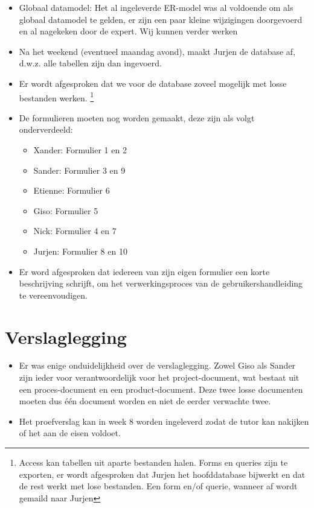 \documentclass[]{article}
\begin{document}
\begin{itemize}
   \item Globaal datamodel: Het al ingeleverde ER-model was al voldoende om als globaal datamodel te gelden, er zijn een paar kleine wijzigingen doorgevoerd en al nagekeken door de expert. Wij kunnen verder werken
   \item Na het weekend (eventueel maandag avond), maakt Jurjen de database af, d.w.z. alle tabellen zijn dan ingevoerd.
   \item Er wordt afgesproken dat we voor de database zoveel mogelijk met losse bestanden werken. \footnote{Access kan tabellen uit aparte bestanden halen. Forms en queries zijn te exporten, er wordt afgesproken dat Jurjen het hoofddatabase bijwerkt en dat de rest werkt met lose bestanden. Een form en/of querie, wanneer af wordt gemaild naar Jurjen} 
   \item De formulieren moeten nog worden gemaakt, deze zijn als volgt onderverdeeld:
   		\begin{itemize}
   			\item Xander: Formulier 1 en 2
   			\item Sander: Formulier 3 en 9
   			\item Etienne: Formulier 6
   			\item Giso: Formulier 5
   			\item Nick: Formulier 4 en 7
   			\item Jurjen: Formulier 8 en 10
   		\end{itemize}
   	\item Er word afgesproken dat iedereen van zijn eigen formulier een korte beschrijving schrijft, om het verwerkingsproces van de gebruikershandleiding te vereenvoudigen.

\end{itemize}

\section{Verslaglegging}

\begin{itemize}
   \item Er was enige onduidelijkheid over de verslaglegging. Zowel Giso als Sander zijn ieder voor verantwoordelijk voor het project-document, wat bestaat uit een proces-document en een product-document. Deze twee losse documenten moeten dus \'e\'en document worden en niet de eerder verwachte twee.
   \item Het proefverslag kan in week 8 worden ingeleverd zodat de tutor kan nakijken of het aan de eisen voldoet.
\end{itemize}
\end{document}
